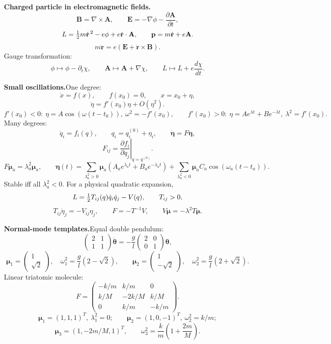 \noindent\textbf{Charged particle in electromagnetic fields.}\quad
\[
\mathbf B=\nabla\times\mathbf A,\qquad
\mathbf E=-\nabla\phi-\frac{\partial\mathbf A}{\partial t},
\]
\[
L=\tfrac{1}{2} m\dot{\mathbf r}^{\,2}-e\phi+e\dot{\mathbf r}\cdot\mathbf A,\qquad
\mathbf p=m\dot{\mathbf r}+e\mathbf A.
\]
\[
\boxed{m\ddot{\mathbf r}=e(\mathbf E+\dot{\mathbf r}\times\mathbf B)}.
\]
Gauge transformation:
\[
\phi\mapsto\phi-\partial_t\chi,\qquad
\mathbf A\mapsto\mathbf A+\nabla\chi,\qquad
L\mapsto L+e\frac{d\chi}{dt}.
\]

\noindent\textbf{Small oscillations.}\quad One degree:
\[
\ddot x=f(x),\qquad f(x_0)=0,\qquad x=x_0+\eta,
\]
\[
\ddot\eta=f'(x_0)\eta+O(\eta^2).
\]
\[
f'(x_0)<0:\ \eta=A\cos(\omega(t-t_0)),\ \omega^2=-f'(x_0),
\qquad
f'(x_0)>0:\ \eta=Ae^{\lambda t}+Be^{-\lambda t},\ \lambda^2=f'(x_0).
\]
Many degrees:
\[
\ddot q_i=f_i(q),\qquad q_i=q_i^{(0)}+\eta_i,\qquad
\ddot{\bm\eta}=F\bm\eta,
\]
\[
F_{ij}=\left.\frac{\partial f_i}{\partial q_j}\right|_{q=q^{(0)}}.
\]
\[
F\bm\mu_a=\lambda_a^2\bm\mu_a,\qquad
\bm\eta(t)=
\sum_{\lambda_a^2>0}\bm\mu_a(A_ae^{\lambda_at}+B_ae^{-\lambda_at})
+\sum_{\lambda_a^2<0}\bm\mu_aC_a\cos(\omega_a(t-t_a)).
\]
Stable iff all $\lambda_a^2<0$. For a physical quadratic expansion,
\[
L=\tfrac{1}{2} T_{ij}(q)\dot q_i\dot q_j-V(q),\qquad T_{ij}>0,
\]
\[
T_{ij}\ddot\eta_j=-V_{ij}\eta_j,\qquad
F=-T^{-1}V,\qquad
V\bm\mu=-\lambda^2T\bm\mu.
\]

\noindent\textbf{Normal-mode templates.}\quad Equal double pendulum:
\[
\begin{pmatrix}2&1\\1&1\end{pmatrix}\ddot{\bm\theta}
=-\frac{g}{l}
\begin{pmatrix}2&0\\0&1\end{pmatrix}\bm\theta,
\]
\[
\bm\mu_1=\begin{pmatrix}1\\ \sqrt2\end{pmatrix},\quad
\omega_1^2=\frac{g}{l}(2-\sqrt2),\qquad
\bm\mu_2=\begin{pmatrix}1\\ -\sqrt2\end{pmatrix},\quad
\omega_2^2=\frac{g}{l}(2+\sqrt2).
\]
Linear triatomic molecule:
\[
F=
\begin{pmatrix}
-k/m&k/m&0\\
k/M&-2k/M&k/M\\
0&k/m&-k/m
\end{pmatrix}.
\]
\[
\bm\mu_1=(1,1,1)^T,\ \lambda_1^2=0;\qquad
\bm\mu_2=(1,0,-1)^T,\ \omega_2^2=k/m;
\]
\[
\bm\mu_3=(1,-2m/M,1)^T,\qquad
\omega_3^2=\frac{k}{m}\left(1+\frac{2m}{M}\right).
\]

